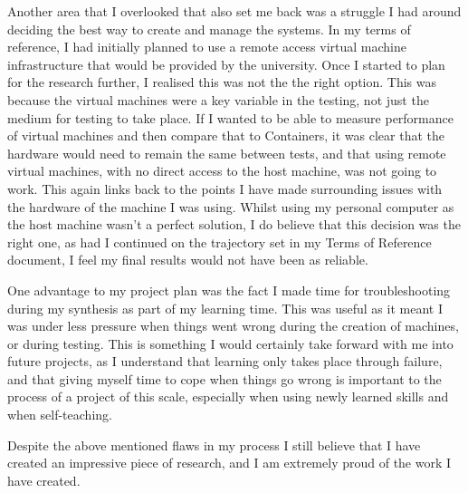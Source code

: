 Another area that I overlooked that also set me back was a struggle I had around deciding the best way to create and manage the systems. In my terms of reference, I had initially planned to use a remote access virtual machine infrastructure that would be provided by the university. Once I started to plan for the research further, I realised this was not the the right option. This was because the virtual machines were a key variable in the testing, not just the medium for testing to take place. If I wanted to be able to measure performance of virtual machines and then compare that to Containers, it was clear that the hardware would need to remain the same between tests, and that using remote virtual machines, with no direct access to the host machine, was not going to work. This again links back to the points I have made surrounding issues with the hardware of the machine I was using. Whilst using my personal computer as the host machine wasn't a perfect solution, I do believe that this decision was the right one, as had I continued on the trajectory set in my Terms of Reference document, I feel my final results would not have been as reliable.

One advantage to my project plan was the fact I made time for troubleshooting during my synthesis as part of my learning time. This was useful as it meant I was under less pressure when things went wrong during the creation of machines, or during testing. This is something I would certainly take forward with me into future projects, as I understand that learning only takes place through failure, and that giving myself time to cope when things go wrong is important to the process of a project of this scale, especially when using newly learned skills and when self-teaching.

Despite the above mentioned flaws in my process I still believe that I have created an impressive piece of research, and I am extremely proud of the work I have created.